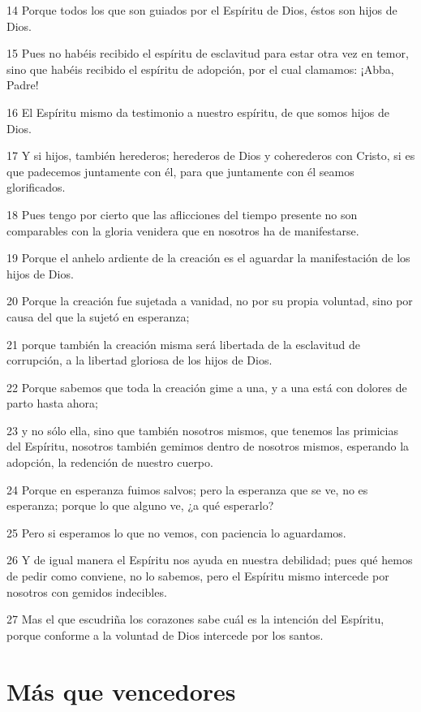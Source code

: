 \par 14 Porque todos los que son guiados por el Espíritu de Dios, éstos son hijos de Dios.
\par 15 Pues no habéis recibido el espíritu de esclavitud para estar otra vez en temor, sino que habéis recibido el espíritu de adopción, por el cual clamamos: ¡Abba, Padre!
\par 16 El Espíritu mismo da testimonio a nuestro espíritu, de que somos hijos de Dios.
\par 17 Y si hijos, también herederos; herederos de Dios y coherederos con Cristo, si es que padecemos juntamente con él, para que juntamente con él seamos glorificados.
\par 18 Pues tengo por cierto que las aflicciones del tiempo presente no son comparables con la gloria venidera que en nosotros ha de manifestarse.
\par 19 Porque el anhelo ardiente de la creación es el aguardar la manifestación de los hijos de Dios.
\par 20 Porque la creación fue sujetada a vanidad, no por su propia voluntad, sino por causa del que la sujetó en esperanza;
\par 21 porque también la creación misma será libertada de la esclavitud de corrupción, a la libertad gloriosa de los hijos de Dios.
\par 22 Porque sabemos que toda la creación gime a una, y a una está con dolores de parto hasta ahora;
\par 23 y no sólo ella, sino que también nosotros mismos, que tenemos las primicias del Espíritu, nosotros también gemimos dentro de nosotros mismos, esperando la adopción, la redención de nuestro cuerpo.
\par 24 Porque en esperanza fuimos salvos; pero la esperanza que se ve, no es esperanza; porque lo que alguno ve, ¿a qué esperarlo?
\par 25 Pero si esperamos lo que no vemos, con paciencia lo aguardamos.
\par 26 Y de igual manera el Espíritu nos ayuda en nuestra debilidad; pues qué hemos de pedir como conviene, no lo sabemos, pero el Espíritu mismo intercede por nosotros con gemidos indecibles.
\par 27 Mas el que escudriña los corazones sabe cuál es la intención del Espíritu, porque conforme a la voluntad de Dios intercede por los santos.

\section*{Más que vencedores}

